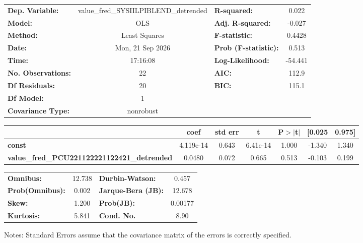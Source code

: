 \begin{center}
\begin{tabular}{lclc}
\toprule
\textbf{Dep. Variable:}                             & value\_fred\_SYSIILPIBLEND\_detrended & \textbf{  R-squared:         } &     0.022   \\
\textbf{Model:}                                     &                  OLS                  & \textbf{  Adj. R-squared:    } &    -0.027   \\
\textbf{Method:}                                    &             Least Squares             & \textbf{  F-statistic:       } &    0.4428   \\
\textbf{Date:}                                      &            Mon, 21 Sep 2026           & \textbf{  Prob (F-statistic):} &    0.513    \\
\textbf{Time:}                                      &                17:16:08               & \textbf{  Log-Likelihood:    } &   -54.441   \\
\textbf{No. Observations:}                          &                     22                & \textbf{  AIC:               } &     112.9   \\
\textbf{Df Residuals:}                              &                     20                & \textbf{  BIC:               } &     115.1   \\
\textbf{Df Model:}                                  &                      1                & \textbf{                     } &             \\
\textbf{Covariance Type:}                           &               nonrobust               & \textbf{                     } &             \\
\bottomrule
\end{tabular}
\begin{tabular}{lcccccc}
                                                    & \textbf{coef} & \textbf{std err} & \textbf{t} & \textbf{P$> |$t$|$} & \textbf{[0.025} & \textbf{0.975]}  \\
\midrule
\textbf{const}                                      &    4.119e-14  &        0.643     &  6.41e-14  &         1.000        &       -1.340    &        1.340     \\
\textbf{value\_fred\_PCU221122221122421\_detrended} &       0.0480  &        0.072     &     0.665  &         0.513        &       -0.103    &        0.199     \\
\bottomrule
\end{tabular}
\begin{tabular}{lclc}
\textbf{Omnibus:}       & 12.738 & \textbf{  Durbin-Watson:     } &    0.457  \\
\textbf{Prob(Omnibus):} &  0.002 & \textbf{  Jarque-Bera (JB):  } &   12.678  \\
\textbf{Skew:}          &  1.200 & \textbf{  Prob(JB):          } &  0.00177  \\
\textbf{Kurtosis:}      &  5.841 & \textbf{  Cond. No.          } &     8.90  \\
\bottomrule
\end{tabular}
\end{center}

Notes: \newline
 [1] Standard Errors assume that the covariance matrix of the errors is correctly specified.